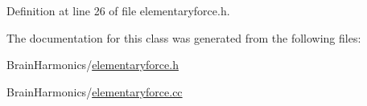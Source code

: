Definition at line 26 of file elementaryforce.\+h.



The documentation for this class was generated from the following files\+:\begin{DoxyCompactItemize}
\item 
Brain\+Harmonics/\mbox{\hyperlink{elementaryforce_8h}{elementaryforce.\+h}}\item 
Brain\+Harmonics/\mbox{\hyperlink{elementaryforce_8cc}{elementaryforce.\+cc}}\end{DoxyCompactItemize}
